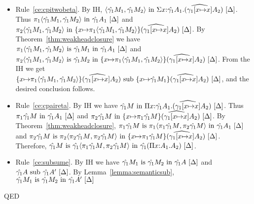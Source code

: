 \documentclass{article}
\theoremstyle{break}
\newcommand{\qed}{\mbox{QED}}
\newcommand{\env}{\gamma}
\newcommand{\envone}{\hat{\env_1}}
\newcommand{\envonex}{\widehat{\env_1[\cvar{\mapsto}\cvar]}}
\newenvironment{proof}{\noindent{\bf Proof:}\hspace*{0.5em}}{\hspace*{\fill}\qed}
\begin{document}
\begin{proof}
\begin{itemize}
\item Rule~\ref{ce:cpitwobeta}.
By IH,
$\semanticvalidterm{\world}{\cpair{\envone\constructor_1}{\envone\constructor_2}}
   {\ksigma{\cvar}{\envone\kind_1}{(\envonex\kind_2)}}$. 
Thus
$\semanticvalidterm{\world}{\cpi{1}{\cpair{\envone\constructor_1}{\envone\constructor_2}}}
   {\envone\kind_1}$ and
$\semanticvalidterm{\world}{\cpi{2}{\cpair{\envone\constructor_1}{\envone\constructor_2}}}
   {\substitute{\cvar}{\cpi{1}{\cpair{\envone\constructor_1}{\envone\constructor_2}}}{(\envonex\kind_2)}}$.
By Theorem~\ref{thm:weakheadclosure} we have
$\semanticequivterm{\world}
  {\cpi{1}{\cpair{\envone\constructor_1}{\envone\constructor_2}}}
  {\envone\constructor_1}
  {\envone\kind_1}$ 
and
$\semanticequivterm{\world}
  {\cpi{2}{\cpair{\envone\constructor_1}{\envone\constructor_2}}}
  {\envone\constructor_2}
   {\substitute{\cvar}{\cpi{1}{\cpair{\envone\constructor_1}{\envone\constructor_2}}}{(\envonex\kind_2)}}$.
From the IH we get
$\semanticsubtype{\world}
   {\substitute{\cvar}{\cpi{1}{\cpair{\envone\constructor_1}{\envone\constructor_2}}}{(\envonex\kind_2)}}
   {\substitute{\cvar}{\envone\constructor_1}{(\envonex\kind_2)}}$,
and the desired conclusion follows.

\item Rule~\ref{ce:cpaireta}.
By IH we have
$\semanticvalidterm{\world}{\envone\constructor}{\kpi{\cvar}{\envone\kind_1}{(\envonex\kind_2)}}$.
Thus
$\semanticvalidterm{\world}{\cpi{1}{\envone\constructor}}{\envone\kind_1}$ and
$\semanticvalidterm{\world}{\cpi{2}{\envone\constructor}}
    {\substitute{\cvar}{\cpi{1}{\envone\constructor}}{(\envonex\kind_2)}}$.
By Theorem~\ref{thm:weakheadclosure},
$\semanticequivterm{\world}{\cpi{1}{\envone\constructor}}
   {\cpi{1}{\cpair{\cpi{1}{\envone\constructor}}{\cpi{2}{\envone\constructor}}}}{\envone\kind_1}$
and
$\semanticequivterm{\world}{\cpi{2}{\envone\constructor}}
   {\cpi{2}{\cpair{\cpi{2}{\envone\constructor}}{\cpi{2}{\envone\constructor}}}}
    {\substitute{\cvar}{\cpi{1}{\envone\constructor}}{(\envonex\kind_2)}}$.
Therefore, 
$\semanticequivterm{\world}{\envone\constructor}
   {\envone\cpair{\cpi{1}{\envone\constructor}}{\cpi{2}{\envone\constructor}}}
   {\envone(\kpi{\cvar}{\kind_1}{\kind_2})}$.

\item Rule~\ref{ce:subsume}.
By IH we have
$\semanticequivterm{\world}{\envone\constructor_1}{\envone\constructor_2}{\envone\kind}$
and
$\semanticsubtype{\world}{\envone\kind}{\envone\kind'}$.
By Lemma~\ref{lemma:semanticsub}, 
$\semanticequivterm{\world}{\envone\constructor_1}{\envone\constructor_2}{\envone\kind'}$

\end{itemize} 
\end{proof}
\end{document}
